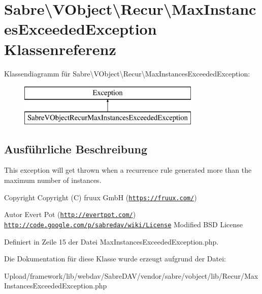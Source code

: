 \hypertarget{class_sabre_1_1_v_object_1_1_recur_1_1_max_instances_exceeded_exception}{}\section{Sabre\textbackslash{}V\+Object\textbackslash{}Recur\textbackslash{}Max\+Instances\+Exceeded\+Exception Klassenreferenz}
\label{class_sabre_1_1_v_object_1_1_recur_1_1_max_instances_exceeded_exception}
Klassendiagramm für Sabre\textbackslash{}V\+Object\textbackslash{}Recur\textbackslash{}Max\+Instances\+Exceeded\+Exception\+:\begin{figure}[H]
\begin{center}
\leavevmode
\includegraphics[height=2.000000cm]{class_sabre_1_1_v_object_1_1_recur_1_1_max_instances_exceeded_exception}
\end{center}
\end{figure}


\subsection{Ausführliche Beschreibung}
This exception will get thrown when a recurrence rule generated more than the maximum number of instances.

\begin{DoxyCopyright}{Copyright}
Copyright (C) fruux GmbH (\href{https://fruux.com/}{\tt https\+://fruux.\+com/}) 
\end{DoxyCopyright}
\begin{DoxyAuthor}{Autor}
Evert Pot (\href{http://evertpot.com/}{\tt http\+://evertpot.\+com/})  \href{http://code.google.com/p/sabredav/wiki/License}{\tt http\+://code.\+google.\+com/p/sabredav/wiki/\+License} Modified B\+SD License 
\end{DoxyAuthor}


Definiert in Zeile 15 der Datei Max\+Instances\+Exceeded\+Exception.\+php.



Die Dokumentation für diese Klasse wurde erzeugt aufgrund der Datei\+:\begin{DoxyCompactItemize}
\item 
Upload/framework/lib/webdav/\+Sabre\+D\+A\+V/vendor/sabre/vobject/lib/\+Recur/Max\+Instances\+Exceeded\+Exception.\+php\end{DoxyCompactItemize}
